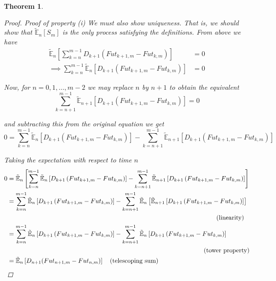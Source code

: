 \documentclass[12pt]{article}
\newtheorem{theorem}{Theorem}
\newlength\tindent
\renewcommand{\indent}{\hspace*{\tindent}}
\newcommand{\E}{\mathbb E}
\begin{document}
\begin{theorem}
\begin{proof} {\em Proof of property (i)}
\indent We must also show uniqueness. That is, we should show that $\tilde{\E}_n[S_m]$ is the only process satisfying the definitions. From above we have
\begin{align*}
	\tilde{\E}_n \left[ \sum^{m - 1}_{k = n} D_{k + 1} \left( Fut_{k + 1,m} - Fut_{k,m} \right) \right] &= 0 \\
	\implies \sum^{m - 1}_{k = n} \tilde{\E}_n \left[ D_{k + 1} \left( Fut_{k + 1,m} - Fut_{k,m} \right) \right] &= 0
\end{align*}

Now, for $n = 0,1,...,m - 2$ we may replace $n$ by $n + 1$ to obtain the equivalent
\begin{equation*}
	\sum^{m - 1}_{k = n + 1} \tilde{\E}_{n + 1} \left[ D_{k + 1} \left( Fut_{k + 1,m} - Fut_{k,m} \right) \right] = 0
\end{equation*}

and subtracting this from the original equation we get
\begin{equation*}
	0 = \sum^{m - 1}_{k = n} \tilde{\E}_n \left[ D_{k + 1} \left( Fut_{k + 1,m} - Fut_{k,m} \right) \right] - \sum^{m - 1}_{k = n + 1} \tilde{\E}_{n + 1} \left[ D_{k + 1} \left( Fut_{k + 1,m} - Fut_{k,m} \right) \right] 
\end{equation*}

Taking the expectation with respect to time $n$
\begin{align*}
	0 &= \tilde{\E}_n \left[ \sum^{m - 1}_{k = n} \tilde{\E}_n \left[ D_{k + 1} \left( Fut_{k + 1,m} - Fut_{k,m} \right) \right] - \sum^{m - 1}_{k = n + 1} \tilde{\E}_{n + 1} \left[ D_{k + 1} \left( Fut_{k + 1,m} - Fut_{k,m} \right) \right] \right] \\
	&= \sum^{m - 1}_{k = n} \tilde{\E}_n \left[ D_{k + 1} \left( Fut_{k + 1,m} - Fut_{k,m} \right) \right] - \sum^{m - 1}_{k = n + 1} \tilde{\E}_n \left[ \tilde{\E}_{n + 1} \left[ D_{k + 1} \left( Fut_{k + 1,m} - Fut_{k,m} \right) \right] \right] \\
	&\hphantom{{}={-------------------------------}} \quad \text{(linearity)} \\
	&= \sum^{m - 1}_{k = n} \tilde{\E}_n \left[ D_{k + 1} \left( Fut_{k + 1,m} - Fut_{k,m} \right) \right] - \sum^{m - 1}_{k = n + 1} \tilde{\E}_n \left[ D_{k + 1} \left( Fut_{k + 1,m} - Fut_{k,m} \right) \right] \\
	&\hphantom{{}={-----------------------------}} \quad \text{(tower property)} \\
	&= \tilde{\E}_n \left[ D_{n + 1}(Fut_{n + 1,m} - Fut_{n,m})\right] \quad \text{(telescoping sum)}
\end{align*}


\end{proof}
\end{theorem}
\end{document}

